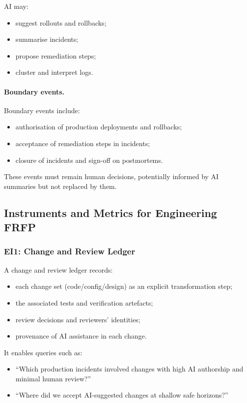 AI may:

\begin{itemize}
  \item suggest rollouts and rollbacks;
  \item summarise incidents;
  \item propose remediation steps;
  \item cluster and interpret logs.
\end{itemize}

\paragraph{Boundary events.}
Boundary events include:

\begin{itemize}
  \item authorisation of production deployments and rollbacks;
  \item acceptance of remediation steps in incidents;
  \item closure of incidents and sign-off on postmortems.
\end{itemize}

These events must remain human decisions, potentially informed by AI
summaries but not replaced by them.

\subsection{Instruments and Metrics for Engineering FRFP}

\subsubsection*{EI1: Change and Review Ledger}

A change and review ledger records:

\begin{itemize}
  \item each change set (code/config/design) as an explicit transformation step;
  \item the associated tests and verification artefacts;
  \item review decisions and reviewers' identities;
  \item provenance of AI assistance in each change.
\end{itemize}

It enables queries such as:

\begin{itemize}
  \item ``Which production incidents involved changes with high AI authorship
        and minimal human review?''
  \item ``Where did we accept AI-suggested changes at shallow safe horizons?''
\end{itemize}

